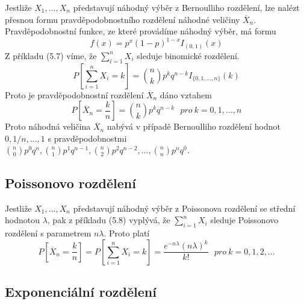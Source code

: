 Jestliže $X_1, ..., X_n$ představují náhodný výběr z Bernoulliho rozdělení, lze nalézt přesnou formu pravděpodobnostního rozdělení náhodné veličiny $\overline{X}_n$. Pravděpodobnostní funkce, ze které provádíme náhodný výběr, má formu
\begin{equation*}
f(x) = p^x(1 - p)^{1 - x}I_{(0, 1)}(x)
\end{equation*}
Z příkladu (5.7) víme, že $\sum_{i = 1}^n X_i$ sleduje binomické rozdělení.
\begin{equation*}
P \left[\sum_{i = 1}^n X_i = k \right] = \binom{n}{k}p^k q^{n - k}I_{\{0, 1, ..., n\}}(k)
\end{equation*}
Proto je pravděpodobnostní rozdělení $\overline{X}_n$ dáno vztahem
\begin{equation*}
P \left[\overline{X}_n = \frac{k}{n} \right] = \binom{n}{k}p^k q^{n - k}~~~\textit{pro}~ k = 0, 1, ..., n 
\end{equation*}
Proto náhodná veličina $\overline{X}_n$ nabývá v případě Bernoulliho rozdělení hodnot $0, 1/n, ..., 1$ s pravděpodobnostmi $\binom{n}{0}p^0 q^n, \binom{n}{1}p^1 q^{n - 1}, \binom{n}{2}p^2 q^{n - 2}, ..., \binom{n}{n}p^n q^0$.

\subsection{Poissonovo rozdělení}

Jestliže $X_1, ..., X_n$ představují náhodný výběr z Poissonova rozdělení se střední hodnotou $\lambda$, pak z příkladu (5.8) vyplývá, že $\sum_{i = 1}^n X_i$ sleduje Poissonovo rozdělení s parametrem $n \lambda$. Proto platí
\begin{equation*}
P \left[\overline{X}_n = \frac{k}{n} \right] = P\left[\sum_{i = 1}^n X_i = k \right] = \frac{e^{-n \lambda}(n \lambda)^k}{k!}~~~\textit{pro}~k = 0, 1, 2, ...
\end{equation*}

\subsection{Exponenciální rozdělení}

